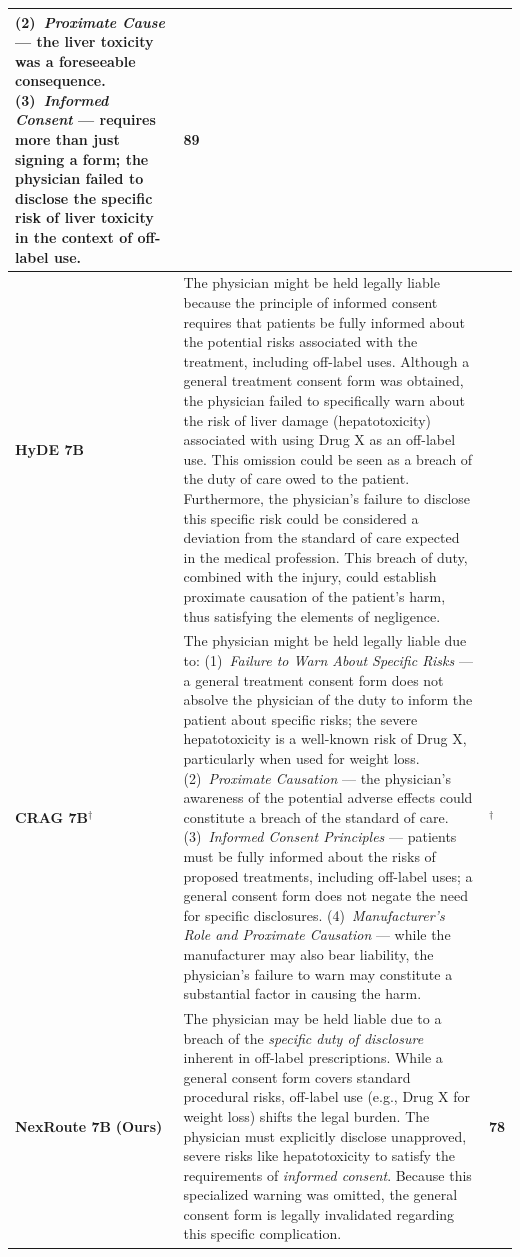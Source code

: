 \documentclass[a4paper,fleql]{cas-sc}
\begin{document}
\begin{center}
\begin{tabular}{m{2.3cm} | m{10.0cm} | >{\centering\arraybackslash}m{1.5cm}}
(2)~\textit{Proximate Cause} --- the liver toxicity was a foreseeable
consequence.
(3)~\textit{Informed Consent} --- requires more than just signing a form; the
physician failed to disclose the specific risk of liver toxicity in the context
of off-label use. & 89 \\
\midrule
\textbf{HyDE 7B}
& The physician might be held legally liable because the principle of informed
consent requires that patients be fully informed about the potential risks
associated with the treatment, including off-label uses. Although a general
treatment consent form was obtained, the physician failed to specifically warn
about the risk of liver damage (hepatotoxicity) associated with using Drug X as
an off-label use. This omission could be seen as a breach of the duty of care
owed to the patient. Furthermore, the physician's failure to disclose this
specific risk could be considered a deviation from the standard of care
expected in the medical profession. This breach of duty, combined with the
injury, could establish proximate causation of the patient's harm, thus
satisfying the elements of negligence. & 116 \\
\midrule
\textbf{CRAG 7B}$^\dagger$
& The physician might be held legally liable due to:
(1)~\textit{Failure to Warn About Specific Risks} --- a general treatment
consent form does not absolve the physician of the duty to inform the patient
about specific risks; the severe hepatotoxicity is a well-known risk of Drug X,
particularly when used for weight loss.
(2)~\textit{Proximate Causation} --- the physician's awareness of the potential
adverse effects could constitute a breach of the standard of care.
(3)~\textit{Informed Consent Principles} --- patients must be fully informed
about the risks of proposed treatments, including off-label uses; a general
consent form does not negate the need for specific disclosures.
(4)~\textit{Manufacturer's Role and Proximate Causation} --- while the
manufacturer may also bear liability, the physician's failure to warn may
constitute a substantial factor in causing the harm. & 256$^\dagger$ \\
\midrule
\textbf{NexRoute 7B} \newline \small\textbf{(Ours)}
& The physician may be held liable due to a breach of the \textit{specific duty
of disclosure} inherent in off-label prescriptions. While a general consent
form covers standard procedural risks, off-label use (e.g., Drug X for weight
loss) shifts the legal burden. The physician must explicitly disclose
unapproved, severe risks like hepatotoxicity to satisfy the requirements of
\textit{informed consent}. Because this specialized warning was omitted, the
general consent form is legally invalidated regarding this specific
complication. & \textbf{78} \\
\bottomrule
\end{tabular}
\endgroup
\end{center}
\vspace{6pt plus 4pt minus 3pt}
\end{document}
